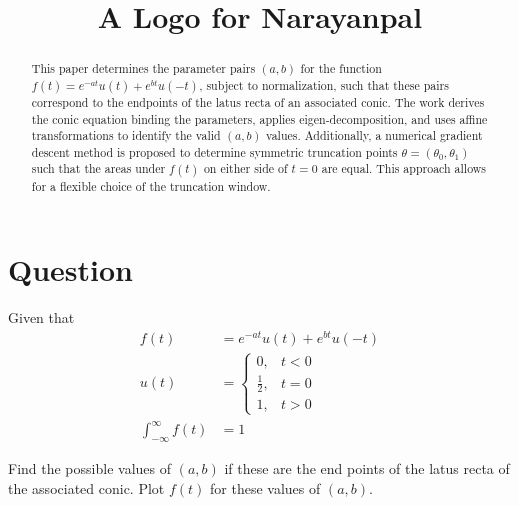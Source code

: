 \documentclass[conference]{IEEEtran}
\theoremstyle{remark}
\begin{document}
	
	\title{A Logo for Narayanpal}
	\author{
		}
	\maketitle
	
\begin{abstract}
	This paper determines the parameter pairs $(a, b)$ for the function $f(t) = e^{-at}u(t) + e^{bt}u(-t)$, subject to normalization, such that these pairs correspond to the endpoints of the latus recta of an associated conic. The work derives the conic equation binding the parameters, applies eigen-decomposition, and uses affine transformations to identify the valid $(a, b)$ values. Additionally, a numerical gradient descent method is proposed to determine symmetric truncation points $\theta = (\theta_0, \theta_1)$ such that the areas under $f(t)$ on either side of $t=0$ are equal. This approach allows for a flexible choice of the truncation window.
\end{abstract}
	\section{Question}
	Given that
	\begin{align}
		f(t) &= e^{-at}u(t) + e^{bt}u(-t) \label{q1}\\
		u(t) &= \begin{cases}
			0, & t<0\\
			\frac{1}{2}, & t=0 \\
			1, & t>0
		\end{cases} \label{q2}\\
		\int_{-\infty}^{\infty} f(t) &= 1 \label{q3}
	\end{align}
	
	Find the possible values of $(a,b)$ if these are the end points of the latus recta of the associated conic. Plot $f(t)$ for these values of $(a,b)$.
	
\end{document}
